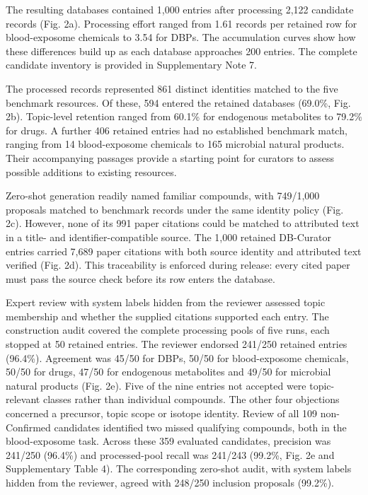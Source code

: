\documentclass[
]{article}
\begin{document}
The resulting databases contained 1,000 entries after processing 2,122 candidate records (Fig. 2a). Processing effort ranged from 1.61 records per retained row for blood-exposome chemicals to 3.54 for DBPs. The accumulation curves show how these differences build up as each database approaches 200 entries. The complete candidate inventory is provided in Supplementary Note 7.

The processed records represented 861 distinct identities matched to the five benchmark resources. Of these, 594 entered the retained databases (69.0\%, Fig. 2b). Topic-level retention ranged from 60.1\% for endogenous metabolites to 79.2\% for drugs. A further 406 retained entries had no established benchmark match, ranging from 14 blood-exposome chemicals to 165 microbial natural products. Their accompanying passages provide a starting point for curators to assess possible additions to existing resources.

Zero-shot generation readily named familiar compounds, with 749/1,000 proposals matched to benchmark records under the same identity policy (Fig. 2c). However, none of its 991 paper citations could be matched to attributed text in a title- and identifier-compatible source. The 1,000 retained DB-Curator entries carried 7,689 paper citations with both source identity and attributed text verified (Fig. 2d). This traceability is enforced during release: every cited paper must pass the source check before its row enters the database.

Expert review with system labels hidden from the reviewer assessed topic membership and whether the supplied citations supported each entry. The construction audit covered the complete processing pools of five runs, each stopped at 50 retained entries. The reviewer endorsed 241/250 retained entries (96.4\%). Agreement was 45/50 for DBPs, 50/50 for blood-exposome chemicals, 50/50 for drugs, 47/50 for endogenous metabolites and 49/50 for microbial natural products (Fig. 2e). Five of the nine entries not accepted were topic-relevant classes rather than individual compounds. The other four objections concerned a precursor, topic scope or isotope identity. Review of all 109 non-Confirmed candidates identified two missed qualifying compounds, both in the blood-exposome task. Across these 359 evaluated candidates, precision was 241/250 (96.4\%) and processed-pool recall was 241/243 (99.2\%, Fig. 2e and Supplementary Table 4). The corresponding zero-shot audit, with system labels hidden from the reviewer, agreed with 248/250 inclusion proposals (99.2\%).
\end{document}

